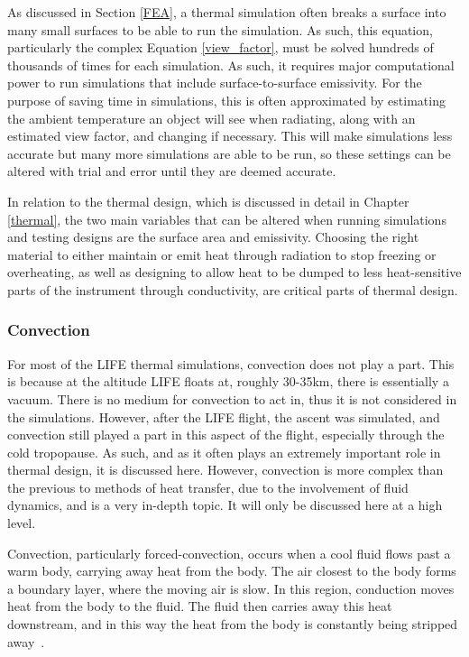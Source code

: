 As discussed in Section \ref{FEA}, a thermal simulation often breaks a surface into many small surfaces to be able to run the simulation. As such, this equation, particularly the complex Equation \ref{view_factor}, must be solved hundreds of thousands of times for each simulation. As such, it requires major computational power to run simulations that include surface-to-surface emissivity. For the purpose of saving time in simulations, this is often approximated by estimating the ambient temperature an object will see when radiating, along with an estimated view factor, and changing if necessary. This will make simulations less accurate but many more simulations are able to be run, so these settings can be altered with trial and error until they are deemed accurate.

 In relation to the thermal design, which is discussed in detail in Chapter \ref{thermal}, the two main variables that can be altered when running simulations and testing designs are the surface area and emissivity. Choosing the right material to either maintain or emit heat through radiation to stop freezing or overheating, as well as designing to allow heat to be dumped to less heat-sensitive parts of the instrument through conductivity, are critical parts of thermal design.

\subsubsection{Convection}
For most of the LIFE thermal simulations, convection does not play a part. This is because at the altitude LIFE floats at, roughly 30-35km, there is essentially a vacuum. There is no medium for convection to act in, thus it is not considered in the simulations. However, after the LIFE flight, the ascent was simulated, and convection still played a part in this aspect of the flight, especially through the cold tropopause. As such, and as it often plays an extremely important role in thermal design, it is discussed here. However, convection is more complex than the previous to methods of heat transfer, due to the involvement of fluid dynamics, and is a very in-depth topic. It will only be discussed here at a high level.

Convection, particularly forced-convection, occurs when a cool fluid flows past a warm body, carrying away heat from the body. The air closest to the body forms a boundary layer, where the moving air is slow. In this region, conduction moves heat from the body to the fluid. The fluid then carries away this heat downstream, and in this way the heat from the body is constantly being stripped away~\citep{heat_transfer_textbook}.

